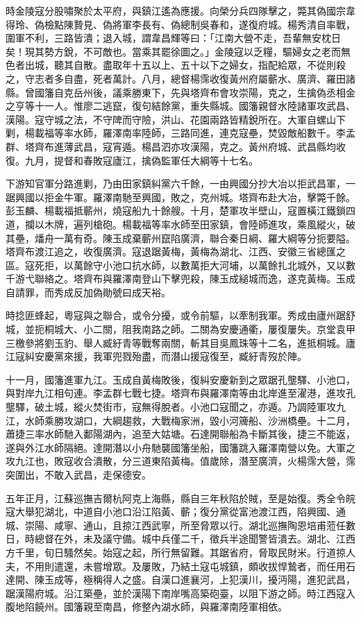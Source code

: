 \begin{pinyinscope}
時金陵寇分股嘯聚於太平府，與鎮江遙為應援。向榮分兵四隊擊之，斃其偽國宗韋得玲、偽檢點陳贄見、偽將軍李長有、偽總制吳春和，遂復府城。楊秀清自率戰，圍軍不利，三路皆潰；退入城，謂韋昌輝等曰：「江南大營不走，吾輩無安枕日矣！現其勢方銳，不可敵也。當乘其罷徐圖之。」金陵寇以乏糧，驅婦女之老而無色者出城，聽其自散。盡取年十五以上、五十以下之婦女，指配給眾，不從則殺之，守志者多自盡，死者萬計。八月，總督楊霈收復黃州府屬蘄水、廣濟、羅田諸縣。曾國籓自克岳州後，議乘勝東下，先與塔齊布會攻崇陽，克之，生擒偽丞相金之亨等十一人。惟廖二逃竄，復句結餘黨，重失縣城。國籓親督水陸諸軍攻武昌、漢陽。寇守城之法，不守陴而守險，洪山、花園兩路皆精銳所在。大軍自螺山下剿，楊載福等率水師，羅澤南率陸師，三路同進，連克寇壘，焚毀敵船數千。李孟群、塔齊布進薄武昌，寇宵遁。楊昌泗亦攻漢陽，克之。黃州府城、武昌縣均收復。九月，提督和春敗寇廬江，擒偽監軍任大綱等十七名。

下游知官軍分路進剿，乃由田家鎮糾黨六千餘，一由興國分抄大冶以拒武昌軍，一踞興國以拒金牛軍。羅澤南馳至興國，敗之，克州城。塔齊布赴大冶，擊斃千餘。彭玉麟、楊載福抵蘄州，燒寇船九十餘艘。十月，楚軍攻半壁山，寇置橫江鐵鎖四道，攔以木牌，遍列槍砲。楊載福等率水師至田家鎮，會陸師進攻，乘風縱火，破其壘，燔舟一萬有奇。陳玉成棄蘄州竄陷廣濟，聯合秦日綱、羅大綱等分扼要隘。塔齊布渡江追之，收復廣濟。寇退踞黃梅，黃梅為湖北、江西、安徽三省總匯之區。寇死拒，以萬餘守小池口抗水師，以數萬拒大河埔，以萬餘扎北城外，又以數千游弋聯絡之。塔齊布與羅澤南登山下擊兜殺，陳玉成縋城而逸，遂克黃梅。玉成自請罪，而秀成反加偽勛號曰成天裕。

時捻匪蜂起，粵寇與之聯合，或令分擾，或令前驅，以牽制我軍。秀成由廬州踞舒城，並扼桐城大、小二關，阻我南路之師。二關為安慶通衢，屢復屢失。京堂袁甲三檄參將劉玉豹、舉人臧紆青等戰奪兩關，斬其目吳鳳珠等十二名，進抵桐城。廬江寇糾安慶黨來援，我軍兜戮殆盡，而潛山援寇復至，臧紆青歿於陣。

十一月，國籓進軍九江。玉成自黃梅敗後，復糾安慶新到之眾踞孔壟驛、小池口，與對岸九江相句連。李孟群七戰七捷。塔齊布與羅澤南等由北岸進至濯港，進攻孔壟驛，破土城，縱火焚街市，寇無得脫者。小池口寇聞之，亦遁。乃調陸軍攻九江，水師乘勝攻湖口，大綱趨救，大戰梅家洲，毀小河簰船、沙洲橋壘。十二月，蕭捷三率水師馳入鄱陽湖內，追至大姑塘。石達開聯船為卡斷其後，捷三不能返，遂與外江水師隔絕。達開潛以小舟馳襲國籓坐船，國籓跳入羅澤南營以免。大軍之攻九江也，敗寇收合潰散，分三道東陷黃梅。值歲除，潛至廣濟，火楊霈大營，霈突圍出，不敢入武昌，走保德安。

五年正月，江蘇巡撫吉爾杭阿克上海縣，縣自三年秋陷於賊，至是始復。秀全令皖寇大舉犯湖北，中道自小池口沿江陷黃、蘄；復分黨從富池渡江西，陷興國、通城、崇陽、咸寧、通山，且掠江西武寧，所至脅眾以行。湖北巡撫陶恩培甫蒞任數日，時總督在外，未及議守備。城中兵僅二千，徵兵半途聞警皆潰去。湖北、江西方千里，旬日騷然矣。始寇之起，所行無留難。其踞省府，脅取民財米。行道掠人夫，不用則遣還，未嘗增眾。及屢敗，乃結土寇屯城鎮，頗收拔悍鷙者，而任用石達開、陳玉成等，極稱得人之盛。自漢口進襄河，上犯漢川，擾沔陽，進犯武昌，踞漢陽府城。沿江築壘，並於漢陽下南岸嘴高築砲臺，以阻下游之師。時江西寇入腹地陷饒州。國籓親至南昌，修整內湖水師，與羅澤南陸軍相依。


\end{pinyinscope}
